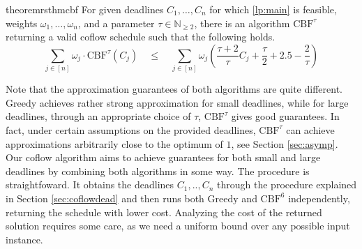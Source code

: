 \documentclass[11pt]{article}
\begin{document}
\begin{restatable}{theorem}{rsthmcbf}\label{thm:cbf}
For given deadlines $C_1,\dotsc,C_n$ for which \ref{lp:main} is feasible, weights $\omega_1,\dotsc,\omega_n$, and a parameter $\tau \in \mathbb{N}_{\ge 2}$, there is an algorithm $\mathrm{CBF}^\tau$ returning a valid coflow schedule such that the following holds.
\begin{equation*}
   \sum_{j \in [n]} \omega_j \cdot \mathrm{CBF}^\tau(C_j) \quad \le \quad \sum_{j \in [n]}\omega_j \left(\frac{\tau+2}{\tau}C_j + \frac{\tau}{2} + 2.5 - \frac{2}{\tau}\right)
\end{equation*}
\end{restatable}

Note that the approximation guarantees of both algorithms are quite different. $\mathrm{Greedy}$ achieves rather strong approximation for small deadlines, while for large deadlines, through an appropriate choice of $\tau$, $\mathrm{CBF}^\tau$ gives good guarantees. In fact, under certain assumptions on the provided deadlines, $\mathrm{CBF}^\tau$ can achieve approximations arbitrarily close to the optimum of $1$, see Section \ref{sec:asymp}.\\

Our coflow algorithm aims to achieve guarantees for both small and large deadlines by combining both algorithms in some way. The procedure is straightfoward. It obtains the deadlines $C_1,..,C_n$ through the procedure explained in Section \ref{sec:coflowdead} and then runs both $\mathrm{Greedy}$ and $\mathrm{CBF}^6$ independently, returning the schedule with lower cost. Analyzing the cost of the returned solution requires some care, as we need a uniform bound over any possible input instance.
\end{document}

